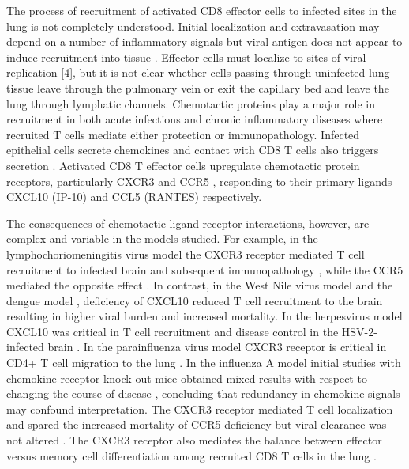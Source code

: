 \documentclass[10pt]{article}
\begin{document}
The process of recruitment of activated CD8 effector cells to infected sites in the lung is not completely understood.  Initial localization and extravasation may depend on a number of inflammatory signals but viral antigen does not appear to induce recruitment into tissue \cite{Topham2001}.   Effector cells must localize to sites of viral replication [4], but it is not clear whether cells passing through uninfected lung tissue leave through the pulmonary vein or exit the capillary bed and leave the lung through lymphatic channels. Chemotactic proteins play a major role in recruitment in both acute infections and chronic inflammatory diseases \cite{Bromley2008, Medoff2005} where recruited T cells mediate either protection or immunopathology.  Infected epithelial cells secrete chemokines \cite{Chan2005} and contact with CD8 T cells also triggers secretion \cite{Zhao2000}. Activated CD8 T effector cells upregulate chemotactic protein receptors, particularly CXCR3 and CCR5 \cite{Hoji2005, Groom2011a}, responding to their primary ligands CXCL10 (IP-10) and CCL5 (RANTES) respectively.  

The consequences of chemotactic ligand-receptor interactions, however, are complex \cite{Groom2011a, Groom2011} and variable in the models studied.   For example, in the lymphochoriomeningitis virus model the CXCR3 receptor mediated T cell recruitment to infected brain and subsequent immunopathology \cite{Christensen2004, Christensen2006}, while the CCR5 mediated the opposite effect \cite{DeLemos2005}.  In contrast, in the West Nile virus model \cite{Klein2005} and the dengue model \cite{Hsieh2006}, deficiency of CXCL10 reduced T cell recruitment to the brain resulting in higher viral burden and increased mortality.   In the herpesvirus model CXCL10 was critical in T cell recruitment and disease control in the HSV-2-infected brain \cite{Wuest2008, Thapa2008}.  In the parainfluenza virus model CXCR3 receptor is critical in CD4+ T cell migration to the lung \cite{Kohlmeier2009}.  In the influenza A model initial studies with chemokine receptor knock-out mice obtained mixed results with respect to changing the course of disease \cite{Dawson2000, Wareing2004}, concluding that redundancy in chemokine signals may confound interpretation.   The CXCR3 receptor mediated T cell localization and spared the increased mortality of CCR5 deficiency but viral clearance was not altered \cite{Fadel2008}.  The CXCR3 receptor also mediates the balance between effector versus memory cell differentiation among recruited CD8 T cells in the lung \cite{Kohlmeier2011}.   
\end{document}
